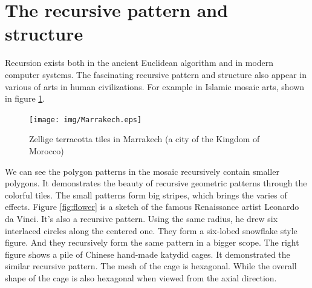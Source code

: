 \documentclass{article}
\begin{document}
\begin{Exercise}
\end{Exercise}

\section{The recursive pattern and structure}

Recursion exists both in the ancient Euclidean algorithm and in modern computer systems. The fascinating recursive pattern and structure also appear in various of arts in human civilizations. For example in Islamic mosaic arts, shown in figure \ref{fig:Ceramic-Tile-Tessellations-Marrakech}.

\begin{figure}[htbp]
 \centering
 \texttt{[image: img/Marrakech.eps]}
 \caption{Zellige terracotta tiles in Marrakech (a city of the Kingdom of Morocco)}
 \label{fig:Ceramic-Tile-Tessellations-Marrakech}
\end{figure}

We can see the polygon patterns in the mosaic recursively contain smaller polygons. It demonstrates the beauty of recursive geometric patterns through the colorful tiles. The small patterns form big stripes, which brings the varies of effects. Figure \ref{fig:flower} is a sketch of the famous Renaissance artist Leonardo da Vinci. It's also a recursive pattern. Using the same radius, he drew six interlaced circles along the centered one. They form a six-lobed snowflake style figure. And they recursively form the same pattern in a bigger scope. The right figure shows a pile of Chinese hand-made katydid cages. It demonstrated the similar recursive pattern. The mesh of the cage is hexagonal. While the overall shape of the cage is also hexagonal when viewed from the axial direction.
\end{document}
